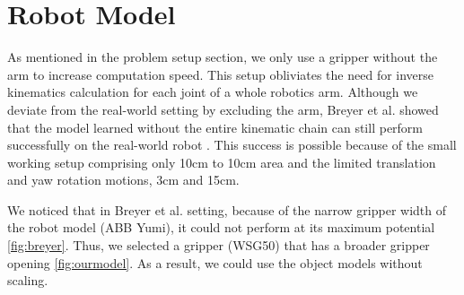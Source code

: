 \section{Robot Model}
As mentioned in the problem setup section, we only use a gripper without the arm to increase computation speed. This setup obliviates the need for inverse kinematics calculation for each joint of a whole robotics arm. Although we deviate from the real-world setting by excluding the arm, Breyer et al. showed that the model learned without the entire kinematic chain can still perform successfully on the real-world robot \cite{Breyer2018}. This success is possible because of the small working setup comprising only 10cm to 10cm area and the limited translation and yaw rotation motions, 3cm and 15cm.

We noticed that in Breyer et al. setting, because of the narrow gripper width of the robot model (ABB Yumi), it could not perform at its maximum potential \ref{fig:breyer}. Thus, we selected a gripper (WSG50) that has a broader gripper opening \ref{fig:ourmodel}. As a result, we could use the object models without scaling.

